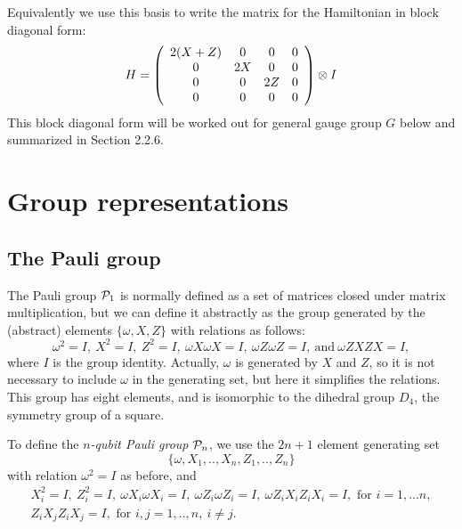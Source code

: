 \documentclass[12pt]{article}
\begin{document}
Equivalently we use this basis to 
write the matrix for the Hamiltonian in
block diagonal form:
$$
H = 
\left( \begin{array}{cccc}
2(X+Z) & 0 & 0 & 0 \\
0  & 2X & 0 & 0 \\
0  & 0 & 2Z & 0 \\
0  & 0 & 0 & 0 \\
\end{array} \right) \otimes I
$$
This block diagonal form will be worked out for
general gauge group $G$ below and summarized in Section 2.2.6.


\section{Group representations}\label{GroupReps}

\subsection{The Pauli group}

The Pauli group $\mathcal{P}_1$ is normally 
defined as a set of matrices closed under
matrix multiplication, but we can define
it abstractly
as the group generated
by the (abstract) elements $\{\omega, X, Z\}$ with
relations as follows:
$$
\omega^2=I,\ X^2=I,\ Z^2=I,\ \omega X\omega X=I,\ \omega Z\omega Z=I,\ \mbox{and}\  \omega ZXZX=I,
$$
where $I$ is the group identity.
Actually, $\omega $ is generated by $X$ and $Z$, so
it is not necessary to include $\omega $ in the generating set,
but here it simplifies the relations.
This group has eight elements, and is isomorphic to the dihedral group $D_4$,
the symmetry group of a square.

To define
the {\it $n$-qubit Pauli group} $\mathcal{P}_n$, 
we use the $2n+1$ element 
generating set 
$$\{\omega , X_1, .., X_n, Z_1, .., Z_n\}$$
with relation $\omega^2=I$ as before, and
\begin{equation}\label{presentation}
\begin{array}{c}
X_i^2=I,\ Z_i^2=I,\ \omega X_i\omega X_i=I,\ \omega Z_i\omega Z_i=I,\ \omega Z_iX_iZ_iX_i=I, 
\mbox{\ for\ } i=1,...n,\\
Z_iX_jZ_iX_j=I, \mbox{\ for\ } i, j = 1,..,n,\ i\ne j.
\end{array}
\end{equation}
\end{document}
